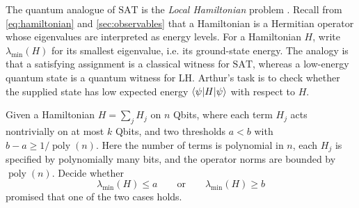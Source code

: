 
\medskip
The quantum analogue of
\(
\mathrm{SAT}
\)
is the \emph{Local Hamiltonian} problem \cite{gharibianQuantumComplexityTheory}.
Recall from \eqref{eq:hamiltonian} and \autoref{sec:observables} that a Hamiltonian is a Hermitian operator whose eigenvalues are interpreted as energy levels.
For a Hamiltonian
\(
H
\),
write
\(
\lambda_{\min}(H)
\)
for its smallest eigenvalue, i.e. its ground-state energy.
%
The analogy is that a satisfying assignment is a classical witness for
\(
\mathrm{SAT}
\),
whereas a low-energy quantum state is a quantum witness for $\mathrm{LH}$.
Arthur's task is to check whether the supplied state has low expected energy 
$\braket{\psi|H|\psi}$ 
with respect to
\(
H
\).

\begin{problem}[\(k\)-$\mathrm{LH}$]\label{problem:k-local-hamiltonian}
Given a Hamiltonian
\(
H=\sum_j H_j
\)
on
\(
n
\)
Qbits, where each term
\(
H_j
\)
acts nontrivially on at most
\(
k
\)
Qbits, and two thresholds
\(
a<b
\)
with
\(
b-a\ge 1/\operatorname{poly}(n)
\).
Here the number of terms is polynomial in \(n\), each \(H_j\) is specified by polynomially many bits, and the operator norms are bounded by \(\operatorname{poly}(n)\).
Decide whether
\[
\lambda_{\min}(H)\le a
\qquad\text{or}\qquad
\lambda_{\min}(H)\ge b
\]
promised that one of the two cases holds.
\end{problem}

